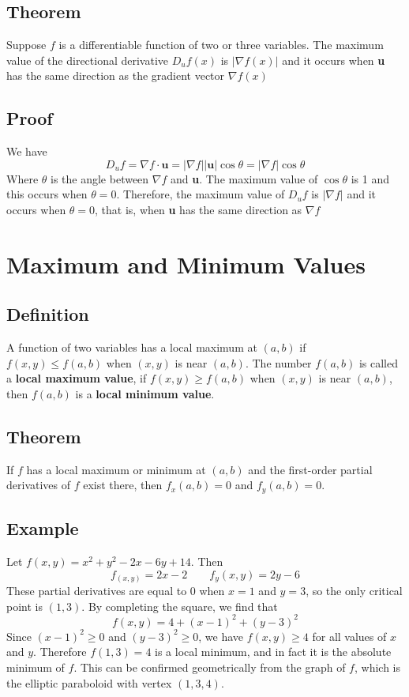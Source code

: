\subsection*{Theorem}
Suppose $f$ is a differentiable function of two or three variables. The maximum
value of the directional derivative $D_uf(x)$ is $|\nabla f(x)|$ and it occurs
when \textbf{u} has the same direction as the gradient vector $\nabla f(x)$

\subsection*{Proof}
We have
$$D_uf=\nabla f\cdot\textbf{u}=|\nabla f||\textbf{u}|\cos{\theta}=|\nabla f|\cos{\theta}$$
Where $\theta$ is the angle between $\nabla f$ and \textbf{u}. The maximum value of $\cos{\theta}$ is 1
and this occurs when $\theta = 0$. Therefore, the maximum value of $D_uf$ is $|\nabla f|$ and
it occurs when $\theta = 0$, that is, when \textbf{u} has the same direction as $\nabla f$

\section{Maximum and Minimum Values}

\subsection*{Definition}
A function of two variables has a {local maximum} at $(a, b)$ if $f(x, y)\leq f(a, b)$
when $(x, y)$ is near $(a, b)$. The number $f(a, b)$ is called a \textbf{local maximum value},
if $f(x, y)\geq f(a, b)$ when $(x, y)$ is near $(a, b)$, then $f(a, b)$ is a \textbf{local minimum value}.

\subsection*{Theorem}
If $f$ has a local maximum or minimum at $(a, b)$ and the first-order partial
derivatives of $f$ exist there, then $f_x (a, b) = 0$ and $f_y (a, b) = 0$.

\subsection*{Example}
Let $f(x,y)=x^2+y^2-2x-6y+14$. Then
$$f_(x,y)=2x-2 \qquad f_y(x,y)=2y-6$$
These partial derivatives are equal to 0 when $x=1$ and $y=3$, so the only critical
point is $(1,3)$. By completing the square, we find that
$$f(x,y)=4+(x-1)^2+(y-3)^2$$
Since $(x-1)^2\geq 0$ and $(y-3)^2\geq 0$, we have $f(x,y)\geq 4$ for all values of
$x$ and $y$. Therefore $f(1,3)=4$ is a local minimum, and in fact it is the absolute
minimum of $f$. This can be confirmed geometrically from the graph of $f$, which is the
elliptic paraboloid with vertex $(1,3,4)$.

